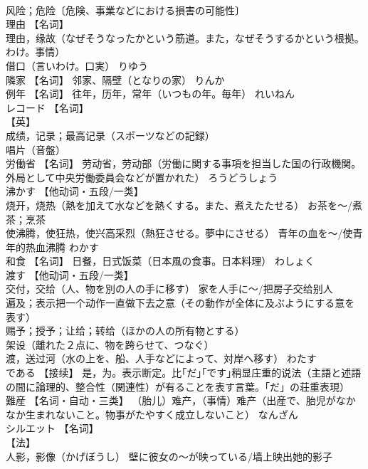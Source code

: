 \documentclass[8pt]{extreport}
\begin{document}
\begin{CJK}{UTF8}{min}
\\	风险；危险〔危険、事業などにおける損害の可能性〕		
\\	理由	【名词】 
\\	理由，缘故（なぜそうなったかという筋道。また，なぜそうするかという根拠。わけ。事情） 
\\	借口（言いわけ。口実）	りゆう	
\\	隣家	【名词】 邻家、隔壁（となりの家）	りんか	
\\	例年	【名词】 往年，历年，常年（いつもの年。毎年）	れいねん	
\\	レコード	【名词】 
\\	【英】
\\	成绩，记录；最高记录（スポーツなどの記録） 
\\	唱片（音盤）		
\\	労働省	【名词】 劳动省，劳动部（労働に関する事項を担当した国の行政機関。外局として中央労働委員会などが置かれた）	ろうどうしょう	
\\	沸かす	【他动词・五段/一类】 
\\	烧开，烧热（熱を加えて水などを熱くする。また、煮えたたせる） お茶を～/煮茶；烹茶 
\\	使沸腾，使狂热，使兴高采烈（熱狂させる。夢中にさせる） 青年の血を～/使青年的热血沸腾	わかす	
\\	和食	【名词】 日餐，日式饭菜（日本風の食事。日本料理）	わしょく	
\\	渡す	【他动词・五段/一类】 
\\	交付，交给（人、物を別の人の手に移す） 家を人手に～/把房子交给别人 
\\	遍及；表示把一个动作一直做下去之意（その動作が全体に及ぶようにする意を表す） 
\\	赐予；授予；让给；转给（ほかの人の所有物とする） 
\\	架设（離れた２点に、物を跨らせて、つなぐ） 
\\	渡，送过河（水の上を、船、人手などによって、対岸へ移す）	わたす	
\\	である	【接续】 是，为。表示断定。比｢だ｣｢です｣稍显庄重的说法（主語と述語の間に論理的、整合性（関連性）が有ることを表す言葉。「だ」の荘重表現）		
\\	難産	【名词・自动・三类】 （胎儿）难产，（事情）难产（出産で、胎児がなかなか生まれないこと。物事がたやすく成立しないこと）	なんざん	
\\	シルエット	【名词】 
\\	【法】
\\	人影，影像（かげぼうし） 壁に彼女の～が映っている/墙上映出她的影子 

\end{CJK}
\end{document}

